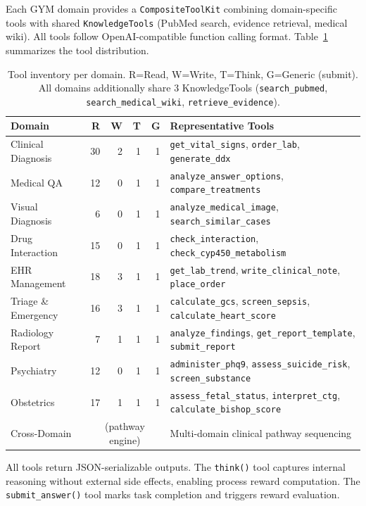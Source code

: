 \documentclass{article}
\begin{document}
Each GYM domain provides a \texttt{CompositeToolKit} combining domain-specific tools with shared \texttt{KnowledgeTools} (PubMed search, evidence retrieval, medical wiki). All tools follow OpenAI-compatible function calling format. Table~\ref{tab:tool_inventory} summarizes the tool distribution.

\begin{table}[h]
\centering
\caption{Tool inventory per domain. R=Read, W=Write, T=Think, G=Generic (submit). All domains additionally share 3 KnowledgeTools (\texttt{search\_pubmed}, \texttt{search\_medical\_wiki}, \texttt{retrieve\_evidence}).}
\label{tab:tool_inventory}
\small
\begin{tabular}{lrrrrl}
\toprule
\textbf{Domain} & \textbf{R} & \textbf{W} & \textbf{T} & \textbf{G} & \textbf{Representative Tools} \\
\midrule
Clinical Diagnosis & 30 & 2 & 1 & 1 & \texttt{get\_vital\_signs}, \texttt{order\_lab}, \texttt{generate\_ddx} \\
Medical QA & 12 & 0 & 1 & 1 & \texttt{analyze\_answer\_options}, \texttt{compare\_treatments} \\
Visual Diagnosis & 6 & 0 & 1 & 1 & \texttt{analyze\_medical\_image}, \texttt{search\_similar\_cases} \\
Drug Interaction & 15 & 0 & 1 & 1 & \texttt{check\_interaction}, \texttt{check\_cyp450\_metabolism} \\
EHR Management & 18 & 3 & 1 & 1 & \texttt{get\_lab\_trend}, \texttt{write\_clinical\_note}, \texttt{place\_order} \\
Triage \& Emergency & 16 & 3 & 1 & 1 & \texttt{calculate\_gcs}, \texttt{screen\_sepsis}, \texttt{calculate\_heart\_score} \\
Radiology Report & 7 & 1 & 1 & 1 & \texttt{analyze\_findings}, \texttt{get\_report\_template}, \texttt{submit\_report} \\
Psychiatry & 12 & 0 & 1 & 1 & \texttt{administer\_phq9}, \texttt{assess\_suicide\_risk}, \texttt{screen\_substance} \\
Obstetrics & 17 & 1 & 1 & 1 & \texttt{assess\_fetal\_status}, \texttt{interpret\_ctg}, \texttt{calculate\_bishop\_score} \\
Cross-Domain & \multicolumn{4}{c}{(pathway engine)} & Multi-domain clinical pathway sequencing \\
\bottomrule
\end{tabular}
\end{table}

All tools return JSON-serializable outputs. The \texttt{think()} tool captures internal reasoning without external side effects, enabling process reward computation. The \texttt{submit\_answer()} tool marks task completion and triggers reward evaluation.
\end{document}
